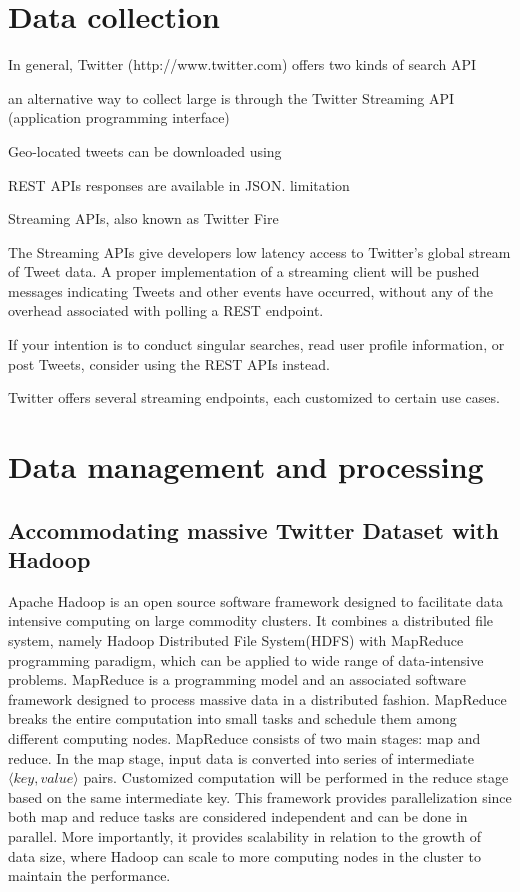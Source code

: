 \documentclass[a4paper,11pt]{article}
\begin{document}
\section*{Data collection}
In general, Twitter (http://www.twitter.com) offers two kinds of search API 

an alternative way to collect large is through the Twitter Streaming API (application programming interface)

Geo-located tweets can be downloaded using 

REST APIs responses are available in JSON.
limitation


Streaming APIs, also known as Twitter Fire 

The Streaming APIs give developers low latency access to Twitter’s global stream of Tweet data. 
A proper implementation of a streaming client will be pushed messages indicating Tweets and other events have occurred, without any of the overhead associated with polling a REST endpoint.


If your intention is to conduct singular searches, read user profile information, or post Tweets, consider using the REST APIs instead.

Twitter offers several streaming endpoints, each customized to certain use cases.


\section*{Data management and processing}
\subsection*{Accommodating massive Twitter Dataset with Hadoop}
Apache Hadoop is an open source software framework designed to facilitate data intensive computing on large commodity clusters.
It combines a distributed file system, namely Hadoop Distributed File System(HDFS) with MapReduce programming paradigm, which can be applied to wide range of data-intensive problems.
MapReduce is a programming model and an associated software framework designed to process massive data in a distributed fashion.
MapReduce breaks the entire computation into small tasks and schedule them among different computing nodes.
MapReduce consists of two main stages: map and reduce.
In the map stage, input data is converted into series of intermediate $\langle key, value\rangle$ pairs.
Customized computation will be performed in the reduce stage based on the same intermediate key.
This framework provides parallelization since both map and reduce tasks are considered independent and can be done in parallel. More importantly, it provides scalability in relation to the growth of data size, where Hadoop can scale to more computing nodes in the cluster to maintain the performance.
\end{document}
